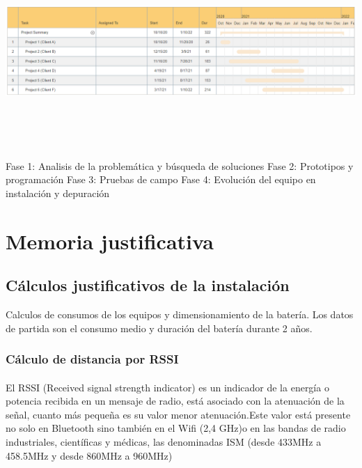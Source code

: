 \documentclass[a4paper ,12pt, onecolumn]{article}
\begin{document}
        \paragraph{}
        \includegraphics[width=15cm, height=8cm]{gantt.PNG}
        Fase 1: Analisis de la problemática y búsqueda de soluciones
        Fase 2: Prototipos y programación
        Fase 3: Pruebas de campo
        Fase 4: Evolución del equipo en instalación y depuración 
\section{Memoria justificativa}
    \subsection{Cálculos justificativos de la instalación}
        Calculos de consumos de los equipos y dimensionamiento de la batería.
        Los datos de partida son el consumo medio y duración del batería durante 2 años.
        \subsubsection{Cálculo de distancia por RSSI}
            \paragraph{}
            El RSSI (Received signal strength indicator) es un indicador de la energía o potencia recibida en un mensaje de radio, 
            está asociado con la atenuación de la señal, cuanto más pequeña es su valor menor atenuación.Este valor está 
            presente no solo en Bluetooth sino también en el Wifi (2,4 GHz)o en las bandas de radio industriales, científicas y médicas,
            las denominadas ISM (desde 433MHz a 458.5MHz y desde 860MHz a 960MHz)
\end{document}
